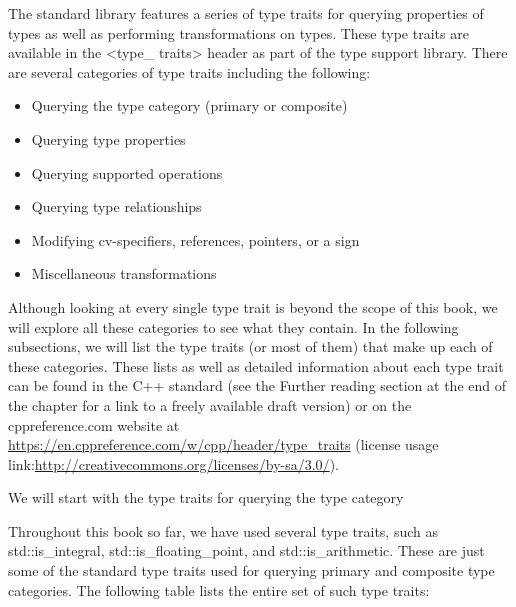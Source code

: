 
The standard library features a series of type traits for querying properties of types as well as performing transformations on types. These type traits are available in the <type\_ traits> header as part of the type support library. There are several categories of type traits including the following:

\begin{itemize}
\item
Querying the type category (primary or composite)

\item
Querying type properties

\item
Querying supported operations

\item
Querying type relationships

\item
Modifying cv-specifiers, references, pointers, or a sign

\item
Miscellaneous transformations
\end{itemize}

Although looking at every single type trait is beyond the scope of this book, we will explore all these categories to see what they contain. In the following subsections, we will list the type traits (or most of them) that make up each of these categories. These lists as well as detailed information about each type trait can be found in the C++ standard (see the Further reading section at the end of the chapter for a link to a freely available draft version) or on the cppreference.com website at \url{https://en.cppreference.com/w/cpp/header/type_traits} (license usage link:\url{http://creativecommons.org/licenses/by-sa/3.0/}).

We will start with the type traits for querying the type category


Throughout this book so far, we have used several type traits, such as std::is\_integral, std::is\_floating\_point, and std::is\_arithmetic. These are just some of the standard type traits used for querying primary and composite type categories. The following table lists the entire set of such type traits:

